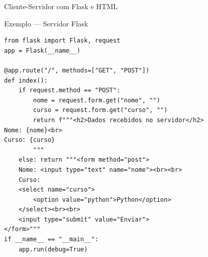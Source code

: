 \documentclass{beamer}
\begin{document}
\begin{frame}{Cliente-Servidor com Flask e HTML}

\centering

\usetikzlibrary{positioning}


\end{frame}

\begin{frame}[fragile]{Exemplo — Servidor Flask}
    
    \begin{verbatim}
from flask import Flask, request
app = Flask(__name__)

@app.route("/", methods=["GET", "POST"])
def index():
    if request.method == "POST":
        nome = request.form.get("nome", "")
        curso = request.form.get("curso", "")
        return f"""<h2>Dados recebidos no servidor</h2>
Nome: {nome}<br>
Curso: {curso}
        """
    else: return """<form method="post">
    Nome: <input type="text" name="nome"><br><br>
    Curso:
    <select name="curso">
        <option value="python">Python</option>
    </select><br><br>
    <input type="submit" value="Enviar">
</form>"""
if __name__ == "__main__":
    app.run(debug=True)
    \end{verbatim}
    
\end{frame}
\end{document}
